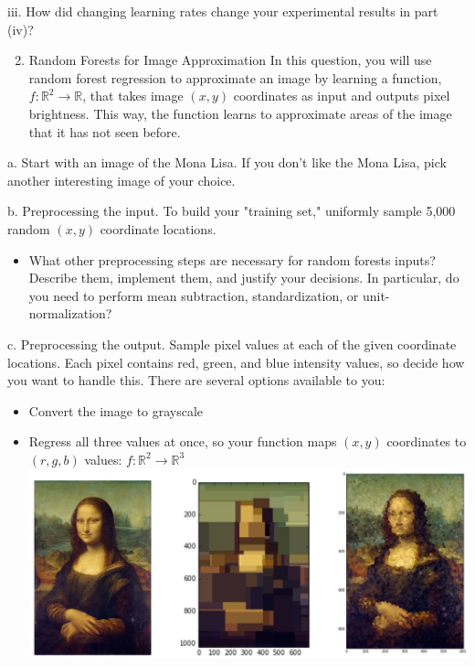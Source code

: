 \documentclass[10pt]{article}
\begin{document}
iii. How did changing learning rates change your experimental results in part (iv)?

\begin{enumerate}
  \setcounter{enumi}{1}
  \item Random Forests for Image Approximation In this question, you will use random forest regression to approximate an image by learning a function, $f: \mathbb{R}^{2} \rightarrow \mathbb{R}$, that takes image $(x, y)$ coordinates as input and outputs pixel brightness. This way, the function learns to approximate areas of the image that it has not seen before.
\end{enumerate}

a. Start with an image of the Mona Lisa. If you don't like the Mona Lisa, pick another interesting image of your choice.

b. Preprocessing the input. To build your "training set," uniformly sample 5,000 random $(x, y)$ coordinate locations.

\begin{itemize}
  \item What other preprocessing steps are necessary for random forests inputs? Describe them, implement them, and justify your decisions. In particular, do you need to perform mean subtraction, standardization, or unit-normalization?
\end{itemize}

c. Preprocessing the output. Sample pixel values at each of the given coordinate locations. Each pixel contains red, green, and blue intensity values, so decide how you want to handle this. There are several options available to you:

\begin{itemize}
  \item Convert the image to grayscale

  \item Regress all three values at once, so your function maps $(x, y)$ coordinates to $(r, g, b)$ values: $f: \mathbb{R}^{2} \rightarrow \mathbb{R}^{3}$
\includegraphics[max width=\textwidth, center]{2023_11_03_3a37fc63330e1b210712g-6}

\end{itemize}
\end{document}
